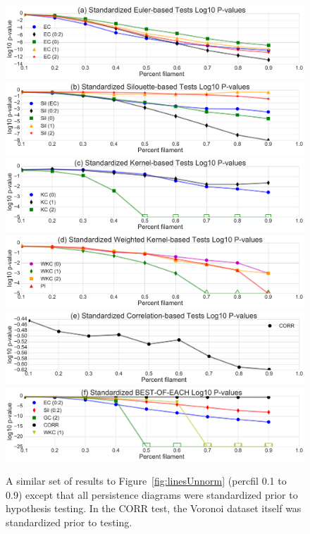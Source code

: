 \documentclass[12pt]{article}
\newcommand{\figref}[1]{Figure~\ref{#1}}
\begin{document}
\begin{description}
\begin{figure}[htp!]
  \centering
  \includegraphics[width=0.7\linewidth]{euler_lineplot_log10_norm_True.pdf}
    \includegraphics[width=0.7\linewidth]{silh_lineplot_log10_norm_True.pdf}
    \includegraphics[width=0.7\linewidth]{smooth_lineplot_log10_norm_True.pdf}
    \includegraphics[width=0.7\linewidth]{weight_lineplot_log10_norm_True.pdf}
    \includegraphics[width=0.7\linewidth]{corr_lineplot_log10_norm_True.pdf}
    \includegraphics[width=0.7\linewidth]{cross_lineplot_log10_norm_True.pdf}
    \caption{A similar set of results to \figref{fig:linesUnnorm} (percfil 0.1 to 0.9) except that all persistence diagrams were standardized prior to hypothesis testing. In the CORR test, the Voronoi dataset itself was standardized prior to testing.}
    \label{fig:linesNorm}
\end{figure}

\end{description}




\end{document}
